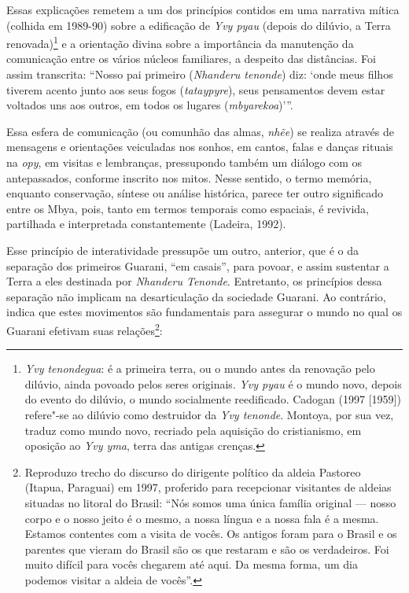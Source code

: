 Essas explicações remetem a um dos princípios contidos em uma narrativa
mítica (colhida em 1989-90) sobre a edificação de \emph{Yvy pyau} (depois do
dilúvio, a Terra renovada)\footnote{\emph{Yvy tenondegua}: é a primeira terra,
ou o mundo antes da renovação pelo dilúvio, ainda povoado pelos seres
originais. \emph{Yvy pyau} é o mundo novo, depois do evento do dilúvio, o
mundo socialmente reedificado. Cadogan (1997 [1959]) refere"-se ao
dilúvio como destruidor da \emph{Yvy tenonde}. Montoya, por sua vez, traduz
como mundo novo, recriado pela aquisição do cristianismo, em oposição
ao \emph{Yvy yma}, terra das antigas crenças. } e a orientação divina sobre a
importância da manutenção da comunicação entre os vários núcleos
familiares, a despeito das distâncias. Foi assim transcrita: ``Nosso pai
primeiro (\emph{Nhanderu tenonde}) diz: ‘onde meus filhos tiverem acento junto
aos seus fogos (\emph{tataypyre}), seus pensamentos devem estar voltados uns
aos outros, em todos os lugares (\emph{mbyarekoa})’''. 

Essa esfera de comunicação (ou comunhão das almas, \emph{nhẽe}) se
realiza através de mensagens e orientações veiculadas nos sonhos, em
cantos, falas e danças rituais na \emph{opy}, em visitas e lembranças,
pressupondo também um diálogo com os antepassados, conforme inscrito
nos mitos. Nesse sentido, o termo memória, enquanto conservação,
síntese ou análise histórica, parece ter outro significado entre os
Mbya, pois, tanto em termos temporais como espaciais, é revivida,
partilhada e interpretada constantemente (Ladeira, 1992). 

Esse princípio de interatividade pressupõe um outro, anterior, que é o
da separação dos primeiros Guarani, ``em casais'', para povoar, e assim
sustentar a Terra a eles destinada por \emph{Nhanderu Tenonde}. Entretanto, os
princípios dessa separação não implicam na desarticulação da sociedade
Guarani. Ao contrário, indica que estes movimentos são fundamentais
para assegurar o mundo no qual os Guarani efetivam suas
relações\footnote{Reproduzo trecho do discurso do dirigente político da
aldeia Pastoreo (Itapua, Paraguai) em 1997, proferido para recepcionar
visitantes de aldeias situadas no litoral do Brasil: ``Nós somos uma
única família original --- nosso corpo e o nosso jeito é o mesmo, a nossa
língua e a nossa fala é a mesma. Estamos contentes com a visita de
vocês. Os antigos foram para o Brasil e os parentes que vieram do
Brasil são os que restaram e são os verdadeiros. Foi muito difícil para
vocês chegarem até aqui. Da mesma forma, um dia podemos visitar a
aldeia de vocês''.}:

